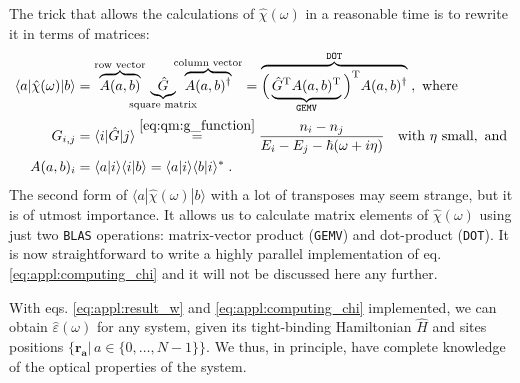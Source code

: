 \documentclass[a4paper,12pt]{article}
\begin{document}
    The trick that allows the calculations of $\hat\chi(\omega)$ in a reasonable time is to rewrite it in terms of matrices:
    \begin{equation} \label{eq:appl:computing_chi}
    \begin{aligned}
        \langle a | \hat\chi(\omega) | b \rangle 
            &= \overbrace{A(a,b)}^\text{row vector}\!\!\!\!\!\!\!\! \underbrace{\hat G}_\text{square matrix}\!\!\!\!\!\!\!\!\!\!\! \overbrace{A(a,b)^\dagger}^\text{column vector}
            = \overbrace{\Big( \underbrace{{\hat G}^\text{T} A(a,b)^\text{T}}_\text{\texttt{GEMV}} \Big)^\text{T} A(a,b)^\dagger}^\text{\texttt{DOT}} \; ,\text{ where} \\
        G_{i,j} &= \langle i | \hat G | j \rangle \overset{\eqref{eq:qm:g_function}}{=} \frac{n_i - n_j}{E_i - E_j - \hbar(\omega + i\eta)} \; \text{\ \ with }\eta\text{ small}, \text{ and}\\
        A(a,b)_i &= \langle a | i \rangle \langle i | b \rangle = \langle a | i \rangle \langle b | i \rangle^* \; .
    \end{aligned}
    \end{equation}
    The second form of $\langle a | \hat \chi(\omega) | b \rangle$ with a lot of transposes may seem strange, but it is of utmost importance. It allows us to calculate matrix elements of $\hat \chi(\omega)$ using just two \texttt{BLAS} operations: matrix-vector product (\texttt{GEMV}) and dot-product (\texttt{DOT}). It is now straightforward to write a highly parallel implementation of eq. \eqref{eq:appl:computing_chi} and it will not be discussed here any further.

    With eqs. \eqref{eq:appl:result_w} and \eqref{eq:appl:computing_chi} implemented, we can obtain $\hat \varepsilon(\omega)$ for any system, given its tight-binding Hamiltonian $\hat H$ and sites positions $\big\{\mathbf{r_a} |\, a \in \{0,\dots,N-1\}\big\}$. We thus, in principle, have complete knowledge of the optical properties of the system.
   
\end{document}

